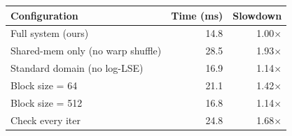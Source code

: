 \begin{tabular}{l r r}
\toprule
\textbf{Configuration} & \textbf{Time (ms)} & \textbf{Slowdown} \\
\midrule
Full system (ours) & 14.8 & 1.00$\times$ \\
Shared-mem only (no warp shuffle) & 28.5 & 1.93$\times$ \\
Standard domain (no log-LSE) & 16.9 & 1.14$\times$ \\
Block size = 64 & 21.1 & 1.42$\times$ \\
Block size = 512 & 16.8 & 1.14$\times$ \\
Check every iter & 24.8 & 1.68$\times$ \\
\bottomrule
\end{tabular}